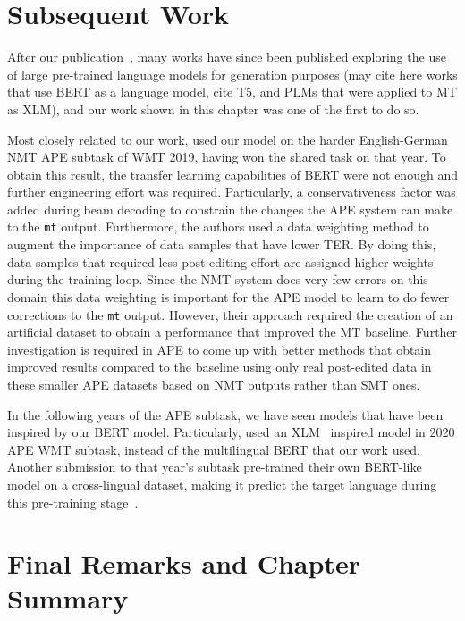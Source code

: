 \section{Subsequent Work}

After our publication~\citep{Correia2019}, many works have since
been published exploring the use of large pre-trained language models
for generation purposes (may cite here works that use BERT as a
language model, cite T5, and PLMs that were applied to MT as XLM), %
and our work shown in this chapter was one of the first to do so.

Most closely related to our work, \citet{lopes2019unbabels} used our
model on the harder English-German NMT APE subtask of WMT 2019,
having won the shared task on that year. To obtain this result, the
transfer learning capabilities of BERT were not enough and further
engineering effort was required. Particularly, a conservativeness
factor was added during beam decoding to constrain the changes the
APE system can make to the {\tt mt} output. Furthermore, the authors
used a data weighting method to augment the importance of data
samples that have lower TER. By doing this, data samples that
required less post-editing effort are assigned higher weights during
the training loop. Since the NMT system does very few errors on this
domain this data weighting is important for the APE model to learn to
do fewer corrections to the {\tt mt} output. However, their approach
required the creation of an artificial dataset to obtain a
performance that improved the MT baseline. Further investigation is
required in APE to come up with better methods that obtain improved
results compared to the baseline using only real post-edited data in
these smaller APE datasets based on NMT outputs rather than SMT ones.

In the following years of the APE subtask, we have seen models that
have been inspired by our BERT model. Particularly,
\citet{lee2020POSTECHETRISubmissionWMT2020} used an
XLM~\citep{lample2019xlm} inspired model in 2020 APE WMT subtask,
instead of the multilingual BERT that our work used. Another
submission to that year's subtask pre-trained their own BERT-like
model on a cross-lingual dataset, making it predict the target
language during this pre-training
stage~\citep{wang2020AlibabaSubmissionWMT}.



\section{Final Remarks and Chapter Summary}

